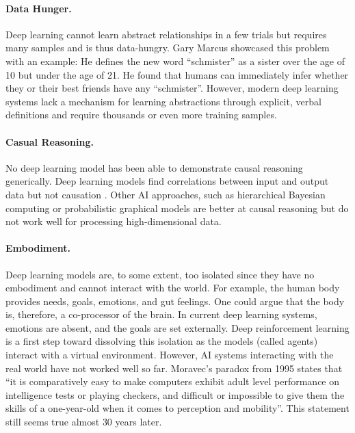 \paragraph{Data Hunger.} Deep learning cannot learn abstract relationships in a few trials but requires many samples and is thus data-hungry.
Gary Marcus  showcased this problem with an example: He defines the new word ``schmister'' as a sister over the age of 10 but under the age of 21. He found that humans can immediately infer whether they or their best friends have any ``schmister''. However, modern deep learning systems lack a mechanism for learning abstractions through explicit, verbal definitions and require thousands or even more training samples.

\paragraph{Casual Reasoning.} No deep learning model has been able to demonstrate causal reasoning generically.
Deep learning models find correlations between input and output data but not causation .
Other AI approaches, such as hierarchical Bayesian computing  or probabilistic graphical models  are better at causal reasoning but do not work well for processing high-dimensional data.

\paragraph{Embodiment.} Deep learning models are, to some extent, too isolated since they have no embodiment and cannot interact with the world.
For example, the human body provides needs, goals, emotions, and gut feelings. One could argue that the body is, therefore, a co-processor of the brain.
In current deep learning systems, emotions are absent, and the goals are set externally.
Deep reinforcement learning  is a first step toward dissolving this isolation as the models (called agents) interact with a virtual environment. 
However, AI systems interacting with the real world have not worked well so far.
Moravec's paradox from 1995  states that ``it is comparatively easy to make computers exhibit adult level performance on intelligence tests or playing checkers, and difficult or impossible to give them the skills of a one-year-old when it comes to perception and mobility''.
This statement still seems true almost $30$ years later.

